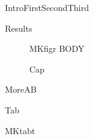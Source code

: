 \documentclass{beamer}
\begin{document}
\begin{frame}{Intro}First\pause Second\pause Third\end{frame}
\begin{frame}{Results}\begin{figure}\centering MKfigr BODY\caption{Cap}\label{fig:r}\end{figure}\end{frame}
\begin{frame}{More}A\pause B\end{frame}
\begin{frame}{Tab}\begin{table}\centering MKtabt\caption{T}\label{tab:t}\end{table}\end{frame}
\end{document}
